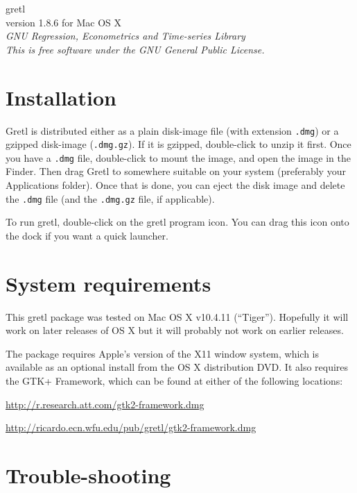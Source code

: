 \documentclass[11pt]{article}
\begin{document}
\begin{center}
{\color{gold} \titlefont gretl} \\[1ex]
version 1.8.6 for Mac OS X \\[2ex]

\textit{GNU Regression, Econometrics and Time-series Library\\
  This is free software under the GNU General Public License.}

\end{center}

\section{Installation}
\label{sec:install}

\textsf{Gretl} is distributed either as a plain disk-image file
(with extension \texttt{.dmg}) or a gzipped disk-image
(\texttt{.dmg.gz}).  If it is gzipped, double-click to unzip it
first.  Once you have a \texttt{.dmg} file, double-click to
mount the image, and open the image in the Finder.
Then drag \textsf{Gretl} to somewhere suitable on your
system (preferably your \textsf{Applications} folder).  Once that
is done, you can eject the disk image and delete the \texttt{.dmg}
file (and the \texttt{.dmg.gz} file, if applicable).

To run gretl, double-click on the gretl program icon.  You can drag
this icon onto the dock if you want a quick launcher.

\section{System requirements}
\label{sec:os}

This gretl package was tested on Mac OS X v10.4.11 (``Tiger'').  
Hopefully it will work on later releases of OS X but it will
probably not work on earlier releases.

The package requires Apple's version of the X11 window system, which
is available as an optional install from the OS X distribution DVD.
It also requires the GTK+ Framework, which can be found at either
of the following locations:

\url{http://r.research.att.com/gtk2-framework.dmg} 

\url{http://ricardo.ecn.wfu.edu/pub/gretl/gtk2-framework.dmg}

\section{Trouble-shooting}
\end{document}

